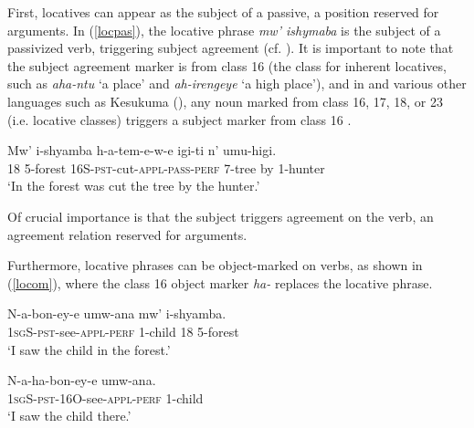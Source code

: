 \documentclass[output=paper]{langsci/langscibook}
\begin{document}
 
First, locatives can appear as the subject of a passive, a position reserved for arguments. In (\ref{locpas}), the locative phrase \emph{mw' ishymaba} is the subject of a passivized verb, triggering subject agreement (cf. \citealt{BresnanKanerva1989,bresnan:1994}). It is important to note that the subject agreement marker is from class 16 (the class for inherent locatives, such as \emph{aha-ntu} `a place' and \emph{ah-irengeye} `a high place'), and in  and various other languages such as Kesukuma ({\citealt[245]{batibo:1985}}), any noun marked from class 16, 17, 18, or 23 (i.e. locative classes) triggers a subject marker from class 16  \citep{maho:1999}.


\begin{exe}

	\ex\label{locpas}\gll Mw' i-shyamba h-a-tem-e-w-e igi-ti n' umu-higi.\\
			{\scshape 18} 5-forest 16S-{\scshape pst}-cut-{\scshape appl-pass-perf} 7-tree by 1-hunter\\
			\glt `In the forest was cut the tree by the hunter.'

\end{exe}
%
 Of crucial importance is that the subject triggers agreement on the verb, an agreement relation reserved for arguments.  



Furthermore, locative phrases can be object-marked on verbs, as shown in (\ref{locom}), where the class 16 object marker \emph{ha-} replaces the locative phrase. 

\begin{exe}
	\ex\begin{xlist}
	\ex\label{loco}\gll N-a-bon-ey-e umw-ana mw' i-shyamba.\\
					1{\scshape sg}S-{\scshape pst}-see-{\scshape appl-perf} 1-child 18 5-forest\\
					\glt `I saw the child in the forest.'
					
	\ex\label{locom}\gll N-a-ha-bon-ey-e umw-ana.\\
			1{\scshape sg}S-{\scshape pst-16O}-see-{\scshape appl-perf} 1-child\\
			\glt `I saw the child there.'
	\end{xlist}
\end{exe}

 
 
\end{document}
